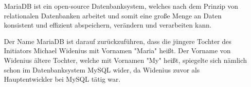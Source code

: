 
MariaDB ist ein open-source Datenbanksystem, welches nach dem Prinzip von relationalen Datenbanken arbeitet und somit eine große Menge an Daten konsistent und effizient abspeichern, verändern und verarbeiten kann.

Der Name MariaDB ist darauf zurückzuführen, dass die jüngere Tochter des Initiators Michael Widenius mit Vornamen "Maria" heißt. Der Vorname von Widenius ältere Tochter, welche mit Vornamen "My" heißt, spiegelte sich nämlich schon im Datenbanksystem MySQL wider, da Widenius zuvor als Hauptentwickler bei MySQL tätig war. \cite{MariaWiki}


